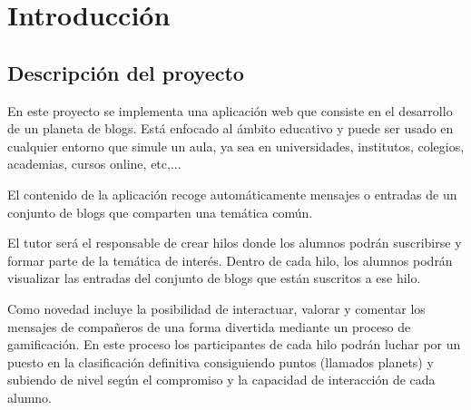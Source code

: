 \documentclass[a4paper, 12pt]{book}
\begin{document}

\tableofcontents 
\cleardoublepage
{}
{} %
\listoffigures %



\cleardoublepage
\chapter{Introducci\'on}
\label{sec:intro} %

\section{Descripci\'on del proyecto}
\label{sec:descripcion}
En este proyecto se implementa una aplicaci\'on web que consiste en el desarrollo de un planeta de blogs. Est\'a enfocado al \'ambito educativo y puede
ser usado en cualquier entorno que simule un aula, ya sea en universidades, institutos, colegios, academias, cursos online, etc,...

El contenido de la aplicaci\'on recoge autom\'aticamente mensajes o entradas de un conjunto de blogs que comparten una tem\'atica com\'un.

El tutor ser\'a el responsable de crear hilos donde los alumnos podr\'an suscribirse y formar parte de la tem\'atica de inter\'es. Dentro de cada hilo,
los alumnos podr\'an visualizar las entradas del conjunto de blogs que est\'an suscritos a ese hilo.

Como novedad incluye la posibilidad de interactuar, valorar y comentar los mensajes de compa\~neros de una forma divertida mediante un proceso de 
gamificaci\'on. En este proceso los participantes de cada hilo podr\'an luchar por un puesto en la clasificaci\'on definitiva consiguiendo 
puntos (llamados planets) y subiendo de nivel seg\'un el compromiso y la capacidad de interacci\'on de cada alumno.
\end{document}
